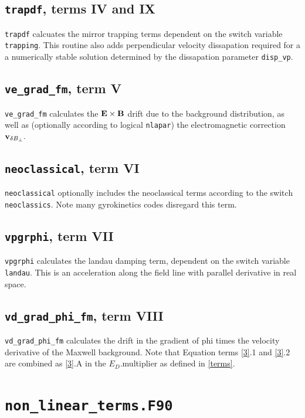 \documentclass{report}
\begin{document}
\subsection{\texttt{trapdf}, terms IV and IX}
\texttt{trapdf} calcuates the mirror trapping terms dependent on the switch variable \texttt{trapping}.   This routine also adds perpendicular velocity dissapation required for a a numerically stable solution determined by the dissapation parameter \texttt{disp\_vp}.

\subsection{\texttt{ve\_grad\_fm}, term V}
\texttt{ve\_grad\_fm} calculates the ${\bf E} \times {\bf B}$ drift due to the background distribution, as well as (optionally according to logical \texttt{nlapar}) the electromagnetic correction ${\bf v}_{\delta B_\perp}.$

\subsection{\texttt{neoclassical}, term VI}
\texttt{neoclassical} optionally includes the neoclassical terms according to the switch \texttt{neoclassics}.  Note many gyrokinetics codes disregard this term.

\subsection{\texttt{vpgrphi}, term VII}
\texttt{vpgrphi} calculates the landau damping term, dependent on the switch variable \texttt{landau}.  This is an acceleration along the field line with parallel derivative in real space.

\subsection{\texttt{vd\_grad\_phi\_fm}, term VIII}
\texttt{vd\_grad\_phi\_fm} calculates the  drift in the gradient of phi times the velocity derivative of the Maxwell background.  Note that Equation terms  \ref{3}.1 and \ref{3}.2 are combined as \ref{3}.A in the $E_D$.multiplier as defined in \ref{terms}.

\section{\texttt{non\_linear\_terms.F90}}%
\end{document}
